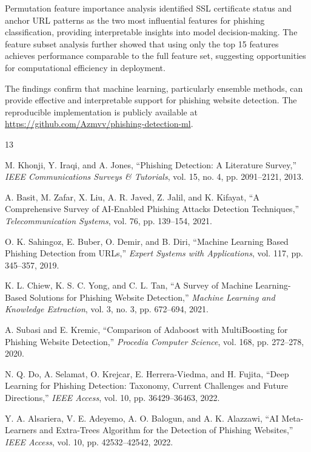\documentclass[conference]{IEEEtran}
\begin{document}
Permutation feature importance analysis identified SSL certificate status and anchor URL patterns as the two most influential features for phishing classification, providing interpretable insights into model decision-making. The feature subset analysis further showed that using only the top 15 features achieves performance comparable to the full feature set, suggesting opportunities for computational efficiency in deployment.

The findings confirm that machine learning, particularly ensemble methods, can provide effective and interpretable support for phishing website detection. The reproducible implementation is publicly available at \url{https://github.com/Azmvv/phishing-detection-ml}.

\begin{thebibliography}{13}

M. Khonji, Y. Iraqi, and A. Jones, ``Phishing Detection: A Literature Survey,'' \textit{IEEE Communications Surveys \& Tutorials}, vol. 15, no. 4, pp. 2091--2121, 2013.

A. Basit, M. Zafar, X. Liu, A. R. Javed, Z. Jalil, and K. Kifayat, ``A Comprehensive Survey of AI-Enabled Phishing Attacks Detection Techniques,'' \textit{Telecommunication Systems}, vol. 76, pp. 139--154, 2021.

O. K. Sahingoz, E. Buber, O. Demir, and B. Diri, ``Machine Learning Based Phishing Detection from URLs,'' \textit{Expert Systems with Applications}, vol. 117, pp. 345--357, 2019.

K. L. Chiew, K. S. C. Yong, and C. L. Tan, ``A Survey of Machine Learning-Based Solutions for Phishing Website Detection,'' \textit{Machine Learning and Knowledge Extraction}, vol. 3, no. 3, pp. 672--694, 2021.

A. Subasi and E. Kremic, ``Comparison of Adaboost with MultiBoosting for Phishing Website Detection,'' \textit{Procedia Computer Science}, vol. 168, pp. 272--278, 2020.

N. Q. Do, A. Selamat, O. Krejcar, E. Herrera-Viedma, and H. Fujita, ``Deep Learning for Phishing Detection: Taxonomy, Current Challenges and Future Directions,'' \textit{IEEE Access}, vol. 10, pp. 36429--36463, 2022.

Y. A. Alsariera, V. E. Adeyemo, A. O. Balogun, and A. K. Alazzawi, ``AI Meta-Learners and Extra-Trees Algorithm for the Detection of Phishing Websites,'' \textit{IEEE Access}, vol. 10, pp. 42532--42542, 2022.


\end{thebibliography}
\end{document}
